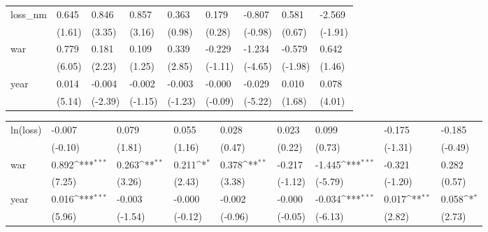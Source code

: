 \begin{tabular}{p{1.5cm} p{2cm} p{1.7cm} p{1.7cm} p{1.7cm} p{1.7cm} p{1.7cm} p{1.7cm} p{1.7cm}}
\hline
loss\_nm         &    0.645         &    0.846\sym{**} &    0.857\sym{**} &    0.363         &    0.179         &   -0.807         &    0.581         &   -2.569         \\
                &   (1.61)         &   (3.35)         &   (3.16)         &   (0.98)         &   (0.28)         &  (-0.98)         &   (0.67)         &  (-1.91)         \\
war             &    0.779\sym{***}&    0.181\sym{*}  &    0.109         &    0.339\sym{**} &   -0.229         &   -1.234\sym{***}&   -0.579         &    0.642         \\
                &   (6.05)         &   (2.23)         &   (1.25)         &   (2.85)         &  (-1.11)         &  (-4.65)         &  (-1.98)         &   (1.46)         \\
year            &    0.014\sym{***}&   -0.004\sym{*}  &   -0.002         &   -0.003         &   -0.000         &   -0.029\sym{***}&    0.010         &    0.078\sym{***}\\
                &   (5.14)         &  (-2.39)         &  (-1.15)         &  (-1.23)         &  (-0.09)         &  (-5.22)         &   (1.68)         &   (4.01)         \\
\end{tabular}
\def\sym#1{\ifmmode^{#1}\else\(^{#1}\)\fi}
\begin{tabular}{p{1.5cm} p{2cm} p{1.7cm} p{1.7cm} p{1.7cm} p{1.7cm} p{1.7cm} p{1.7cm} p{1.7cm}}
\hline
ln(loss)        &   -0.007         &    0.079         &    0.055         &    0.028         &    0.023         &    0.099         &   -0.175         &   -0.185         \\
                &  (-0.10)         &   (1.81)         &   (1.16)         &   (0.47)         &   (0.22)         &   (0.73)         &  (-1.31)         &  (-0.49)         \\
war             &    0.892\sym{***}&    0.263\sym{**} &    0.211\sym{*}  &    0.378\sym{**} &   -0.217         &   -1.445\sym{***}&   -0.321         &    0.282         \\
                &   (7.25)         &   (3.26)         &   (2.43)         &   (3.38)         &  (-1.12)         &  (-5.79)         &  (-1.20)         &   (0.57)         \\
year            &    0.016\sym{***}&   -0.003         &   -0.000         &   -0.002         &   -0.000         &   -0.034\sym{***}&    0.017\sym{**} &    0.058\sym{*}  \\
                &   (5.96)         &  (-1.54)         &  (-0.12)         &  (-0.96)         &  (-0.05)         &  (-6.13)         &   (2.82)         &   (2.73)         \\
\end{tabular}
